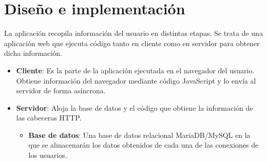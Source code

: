 \chapter{Diseño e implementación}
La aplicación recopila información del usuario en distintas etapas. Se trata de una aplicación web que ejecuta código tanto en cliente como en servidor para obtener dicha información.
\begin{itemize}
    \item \textbf{Cliente}: Es la parte de la aplicación ejecutada en el navegador del usuario. Obtiene información del navegador mediante código JavaScript y lo envía al servidor de forma asíncrona.
    \item \textbf{Servidor}: Aloja la base de datos y el código que obtiene la información de las cabeceras HTTP.
     \begin{itemize}
         \item \textbf{Base de datos}: Una base de datos relacional MariaDB/MySQL en la que se almacenarán los datos obtenidos de cada una de las conexiones de los usuarios.
     \end{itemize}
\end{itemize}
